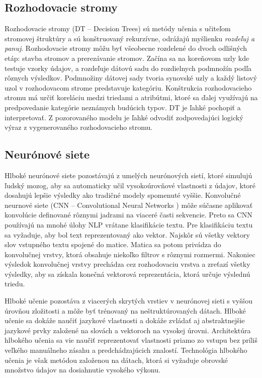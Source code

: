 \subsection*{Rozhodovacie stromy}
Rozhodovacie stromy (DT -- Decision Trees) sú metódy učenia s učiteľom stromovej štruktúry a sú konštruovaný rekurzívne, odrážajú myšlienku \textit{rozdeľuj a panuj}. Rozhodovacie stromy môžu byť všeobecne rozdelené do dvoch odlišných etáp: stavba stromov a prerezávanie stromov. Začína sa na koreňovom uzly kde testuje vzorky údajov, a rozdeľuje dátovú sadu do rozdielnych podmnožín podľa rôznych výsledkov. Podmnožiny dátovej sady tvoria synovské uzly a každý listový uzol v rozhodovacom strome predstavuje kategóriu. Konštrukcia rozhodovacieho stromu má určiť koreláciu medzi triedami a atribútmi, ktoré sa ďalej využívajú na predpovedanie kategórie neznámych budúcich typov. DT je ľahké pochopiť a interpretovať. Z pozorovaného modelu je ľahké odvodiť zodpovedajúci logický výraz z vygenerovaného rozhodovacieho stromu.

\subsection*{Neurónové siete}
Hlboké neurónové siete pozostávajú z umelých neurónových sietí, ktoré simulujú ľudský mozog, aby sa automaticky učil vysokoúrovňové vlastnosti z údajov, ktoré dosahujú lepšie výsledky ako tradičné modely spomenuté vyššie. Konvolučné neurnové siete (CNN -- Convolutional Neural Networks ) môže súčasne aplikovať konvolúcie definované rôznymi jadrami na viaceré časti sekvencie. Preto sa CNN používajú na mnohé úlohy NLP vrátane klasifikácie textu. Pre klasifikáciu textu sa vyžaduje, aby bol text reprezentovaný ako vektor. Najskôr sú všetky vektory slov vstupného textu spojené do matice. Matica sa potom privádza do konvolučnej vrstvy, ktorá obsahuje niekoľko filtrov s rôznymi rozmermi. Nakoniec výsledok konvolučnej vrstvy prechádza cez rozhodovaciu vrstva a zreťazí všetky výsledky, aby sa získala konečná vektorová reprezentácia, ktorá určuje výslednú triedu. 

Hlboké učenie pozostáva z viacerých skrytých vrstiev v neurónovej sieti s vyššou úrovňou zložitosti a môže byť trénovaný na neštruktúrovaných dátach. Hlboké učenie sa dokáže naučiť jazykové vlastnosti a dokáže zvládať aj abstraktnejšie jazykové prvky založené na slovách a vektoroch na vysokej úrovni. Architektúra hlbokého učenia sa vie naučiť reprezentovať vlastnosti priamo zo vstupu bez príliš veľkého manuálneho zásahu a predchádzajúcich znalostí. Technológia hlbokého učenia je však metódou založenou na dátach, ktorá si vyžaduje obrovské množstvo údajov na dosiahnutie vysokého výkonu. 

